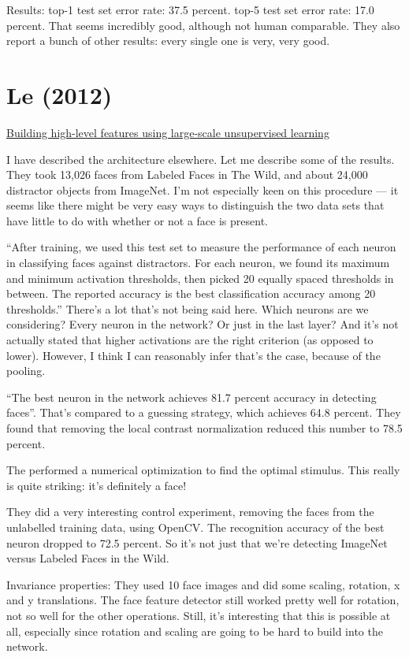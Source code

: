 \documentclass[12pt]{report}
\newcommand{\link}[2]{\href{#1}{#2}}
\begin{document}
Results: top-1 test set error rate: 37.5 percent.  top-5 test set
error rate: 17.0 percent.  That seems incredibly good, although not
human comparable.  They also report a bunch of other results: every
single one is very, very good.

\section{Le (2012)}

\link{http://ai.stanford.edu/\~ang/papers/icml12-HighLevelFeaturesUsingUnsupervisedLearning.pdf}{Building
  high-level features using large-scale unsupervised learning}

I have described the architecture elsewhere.  Let me describe some of
the results.  They took 13,026 faces from Labeled Faces in The Wild,
and about 24,000 distractor objects from ImageNet.  I'm not especially
keen on this procedure --- it seems like there might be very easy ways
to distinguish the two data sets that have little to do with whether
or not a face is present.

``After training, we used this test set to measure the performance of
each neuron in classifying faces against distractors.  For each
neuron, we found its maximum and minimum activation thresholds, then
picked 20 equally spaced thresholds in between.  The reported accuracy
is the best classification accuracy among 20 thresholds.''  There's a
lot that's not being said here.  Which neurons are we considering?
Every neuron in the network?  Or just in the last layer?  And it's not
actually stated that higher activations are the right criterion (as
opposed to lower).  However, I think I can reasonably infer that's the
case, because of the pooling.

``The best neuron in the network achieves 81.7 percent accuracy in
detecting faces''.  That's compared to a guessing strategy, which
achieves 64.8 percent.  They found that removing the local contrast
normalization reduced this number to 78.5 percent.

The performed a numerical optimization to find the optimal stimulus.
This really is quite striking: it's definitely a face!

They did a very interesting control experiment, removing the faces
from the unlabelled training data, using OpenCV.  The recognition
accuracy of the best neuron dropped to 72.5 percent.  So it's not just
that we're detecting ImageNet versus Labeled Faces in the Wild.

Invariance properties: They used 10 face images and did some scaling,
rotation, x and y translations.  The face feature detector still
worked pretty well for rotation, not so well for the other operations.
Still, it's interesting that this is possible at all, especially since
rotation and scaling are going to be hard to build into the network.
\end{document}
